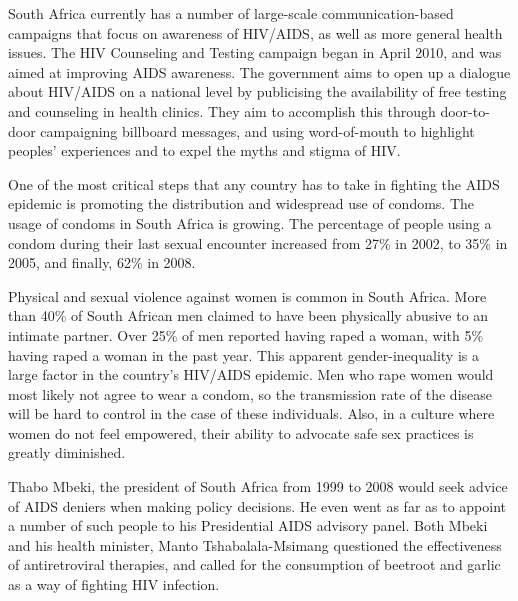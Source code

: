 \documentclass[12pt]{report}
\begin{document}
South Africa currently has a number of large-scale communication-based campaigns that focus on awareness of HIV/AIDS, as well as more general health issues.
The HIV Counseling and Testing campaign began in April 2010, and was aimed at improving AIDS awareness.
The government aims to open up a dialogue about HIV/AIDS on a national level by publicising the availability of free testing and counseling in health clinics.
They aim to accomplish this through door-to-door campaigning billboard messages, and using word-of-mouth to highlight peoples' experiences and to expel the myths and stigma of HIV.

One of the most critical steps that any country has to take in fighting the AIDS epidemic is promoting the distribution and widespread use of condoms.
The usage of condoms in South Africa is growing.  The percentage of people using a condom during their last sexual encounter increased from 27\% in 2002, to 35\% in 2005, and finally, 62\% in 2008\cite{shisana}.

Physical and sexual violence against women is common in South Africa. 
More than 40\% of South African men claimed to have been physically abusive to an intimate partner.
Over 25\% of men reported having raped a woman, with 5\% having raped a woman in the past year\cite{avert}.
This apparent gender-inequality is a large factor in the country's HIV/AIDS epidemic.  
Men who rape women would most likely not agree to wear a condom, so the transmission rate of the disease will be hard to control in the case of these individuals.
Also, in a culture where women do not feel empowered, their ability to advocate safe sex practices is greatly diminished.

Thabo Mbeki, the president of South Africa from 1999 to 2008 would seek advice of AIDS deniers when making policy decisions.  
He even went as far as to appoint a number of such people to his Presidential AIDS advisory panel.  
Both Mbeki and his health minister, Manto Tshabalala-Msimang questioned the effectiveness of antiretroviral therapies, and called for the consumption of beetroot and garlic as a way of fighting HIV infection.
\end{document}
